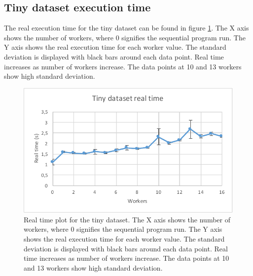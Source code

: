 \subsection{Tiny dataset execution time}
The real execution time for the tiny dataset can be found in figure \ref{fig:dataset_1_real_time}.
The X axis shows the number of workers, where 0 signifies the sequential program run.
The Y axis shows the real execution time for each worker value. The standard deviation is displayed with black bars around each data point. Real time
increases as number of workers increase. The data points at 10 and 13 workers show high standard deviation.
\begin{figure}[ht]
  \centering
  \includegraphics[width=120mm]{figures/dataset_1/dataset_1_real_time.pdf}
  \caption[Real time plot for the tiny dataset.]{Real time plot for the tiny dataset. The X axis shows the number of workers, where 0 signifies the sequential program run.
  The Y axis shows the real execution time for each worker value. The standard deviation is displayed with black bars around each data point. Real time
  increases as number of workers increase. The data points at 10 and 13 workers show high standard deviation.}
  \label{fig:dataset_1_real_time}
\end{figure}

